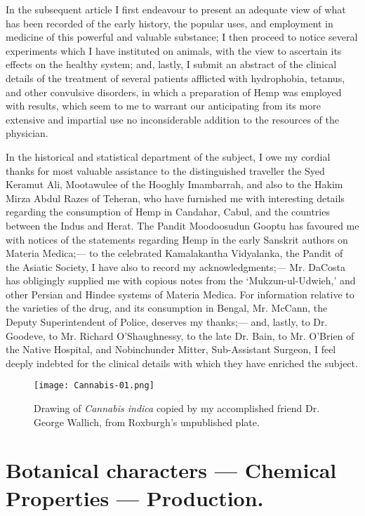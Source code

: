 \documentclass[a4paper, 11pt, oneside, polutonikogreek, english]{article}
\begin{document}
In the subsequent article I first endeavour to present an adequate view of what has been recorded of the early history, the popular uses, and employment in medicine of this powerful and valuable substance; I then proceed to notice several experiments which I have instituted on animals, with the view to ascertain its effects on the healthy system; and, lastly, I submit an abstract of the clinical details of the treatment of several patients afflicted with hydrophobia, tetanus, and other convulsive disorders, in which a preparation of Hemp was employed with results, which seem to me to warrant our anticipating from its more extensive and impartial use no inconsiderable addition to the resources of the physician.

In the historical and statistical department of the subject, I owe my cordial thanks for most valuable assistance to the distinguished traveller the Syed Keramut Ali, Mootawulee of the Hooghly Imambarrah, and also to the Hakim Mirza Abdul Razes of Teheran, who have furnished me with interesting details regarding the consumption of Hemp in Candahar, Cabul, and the countries between the Indus and Herat. The Pandit Moodoosudun Gooptu has favoured me with notices of the statements regarding Hemp in the early Sanskrit authors on Materia Medica;--- to the celebrated Kamalakantha Vidyalanka, the Pandit of the Asiatic Society, I have also to record my acknowledgments;--- Mr. DaCosta has obligingly supplied me with copious notes from the `Mukzun-ul-Udwieh,' and other Persian and Hindee systems of Materia Medica. For information relative to the varieties of the drug, and its consumption in Bengal, Mr. McCann, the Deputy Superintendent of Police, deserves my thanks;--- and, lastly, to Dr. Goodeve, to Mr. Richard O'Shaughnessy, to the late Dr. Bain, to Mr. O'Brien of the Native Hospital, and Nobinchunder Mitter, Sub-Assistant Surgeon, I feel deeply indebted for the clinical details with which they have enriched the subject.
\clearpage
\begin{figure}[H]
\centering
\texttt{[image: Cannabis-01.png]}
\caption{Drawing of \emph{Cannabis indica} copied by my accomplished friend Dr. George Wallich, from Roxburgh's unpublished plate.}
\end{figure}
\clearpage
\section{Botanical characters --- Chemical Properties --- Production.}
\end{document}
